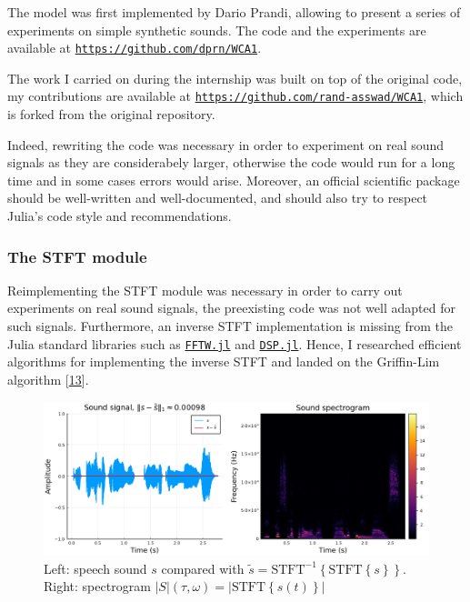 \documentclass[american,]{article}
\theoremstyle{definition}
\theoremstyle{definition}
\theoremstyle{definition}
\theoremstyle{remark}
\begin{document}
The model was first implemented by Dario Prandi,
allowing to present a series of experiments on simple synthetic sounds.
The code and the experiments are available at
\href{https://github.com/dprn/WCA1}{\texttt{https://github.com/dprn/WCA1}}.

The work I carried on during the internship was built on top of the original code,
my contributions are available at
\href{https://github.com/rand-asswad/WCA1}{\texttt{https://github.com/rand-asswad/WCA1}},
which is forked from the original repository.

Indeed, rewriting the code was necessary in order to experiment
on real sound signals as they are considerabely larger,
otherwise the code would run for a long time and in some cases
errors would arise.
Moreover, an official scientific package should be well-written
and well-documented, and should also try to respect Julia's
code style and recommendations.

\hypertarget{the-stft-module}{%
\subsubsection{The STFT module}\label{the-stft-module}}

Reimplementing the STFT module was necessary in order to carry out
experiments on real sound signals, the preexisting code was not well
adapted for such signals.
Furthermore, an inverse STFT implementation is missing from the Julia
standard libraries such as \href{https://juliapackages.com/p/fftw}{\texttt{FFTW.jl}}
and \href{https://juliapackages.com/p/dsp}{\texttt{DSP.jl}}.
Hence, I researched efficient algorithms for implementing the inverse STFT
and landed on the Griffin-Lim algorithm {[}\protect\hyperlink{ref-griffin1983}{13}{]}.

\begin{figure}
\centering
\includegraphics{img/stft_istft.png}
\caption{Left: speech sound \(s\) compared with \(\tilde s=\mathrm{STFT}^{-1}\left\{\mathrm{STFT}\left\{s\right\}\right\}\). Right: spectrogram \(\left\lvert S\right\rvert(\tau,\omega)=\left\lvert\mathrm{STFT}\left\{s(t)\right\}\right\rvert\)}
\end{figure}
\end{document}
